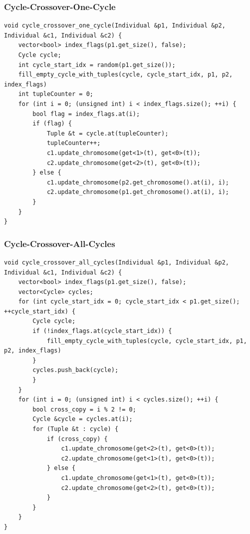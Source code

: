 \subsubsection{Cycle-Crossover-One-Cycle}
\begin{minipage}{\linewidth}
\begin{lstlisting}[caption={Cycle-Crossover-One-Cycle}, firstnumber=1, captionpos=b, label=lst:cxo]
void cycle_crossover_one_cycle(Individual &p1, Individual &p2, Individual &c1, Individual &c2) {
	vector<bool> index_flags(p1.get_size(), false);
	Cycle cycle;
	int cycle_start_idx = random(p1.get_size());
	fill_empty_cycle_with_tuples(cycle, cycle_start_idx, p1, p2, index_flags)
	int tupleCounter = 0;
	for (int i = 0; (unsigned int) i < index_flags.size(); ++i) {
		bool flag = index_flags.at(i);
		if (flag) {
			Tuple &t = cycle.at(tupleCounter);
			tupleCounter++;
			c1.update_chromosome(get<1>(t), get<0>(t));
			c2.update_chromosome(get<2>(t), get<0>(t));
		} else {
 			c1.update_chromosome(p2.get_chromosome().at(i), i);
			c2.update_chromosome(p1.get_chromosome().at(i), i);
		}
	}
}
\end{lstlisting}
\end{minipage}

\subsubsection{Cycle-Crossover-All-Cycles}
\begin{minipage}{\linewidth}
\begin{lstlisting}[caption={Cycle-Crossover-All-Cycles}, firstnumber=1, captionpos=b, label=lst:cxa]
void cycle_crossover_all_cycles(Individual &p1, Individual &p2, Individual &c1, Individual &c2) {
	vector<bool> index_flags(p1.get_size(), false);
	vector<Cycle> cycles;
	for (int cycle_start_idx = 0; cycle_start_idx < p1.get_size(); ++cycle_start_idx) {
		Cycle cycle;
		if (!index_flags.at(cycle_start_idx)) {
			fill_empty_cycle_with_tuples(cycle, cycle_start_idx, p1, p2, index_flags)
		}
		cycles.push_back(cycle);
		}
	}
	for (int i = 0; (unsigned int) i < cycles.size(); ++i) {
		bool cross_copy = i % 2 != 0;
		Cycle &cycle = cycles.at(i);
		for (Tuple &t : cycle) {
			if (cross_copy) {
				c1.update_chromosome(get<2>(t), get<0>(t));
				c2.update_chromosome(get<1>(t), get<0>(t));
			} else {
				c1.update_chromosome(get<1>(t), get<0>(t));	
 				c2.update_chromosome(get<2>(t), get<0>(t));
			}
		}
	}
}

\end{lstlisting}
\end{minipage}
